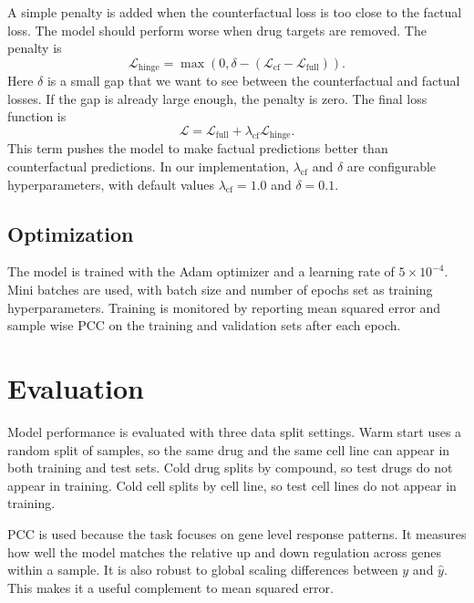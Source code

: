 A simple penalty is added when the counterfactual loss is too close to the factual loss. The model should perform worse when drug targets are removed. The penalty is
\begin{equation}
\mathcal{L}_{\mathrm{hinge}}=\max\!\left(0,\delta-\left(\mathcal{L}_{\mathrm{cf}}-\mathcal{L}_{\mathrm{full}}\right)\right).
\end{equation}
Here $\delta$ is a small gap that we want to see between the counterfactual and factual losses. If the gap is already large enough, the penalty is zero.
The final loss function is
\begin{equation}
\mathcal{L}=\mathcal{L}_{\mathrm{full}}+\lambda_{\mathrm{cf}}\mathcal{L}_{\mathrm{hinge}}.
\end{equation}
This term pushes the model to make factual predictions better than counterfactual predictions. In our implementation, $\lambda_{\mathrm{cf}}$ and $\delta$ are configurable hyperparameters, with default values $\lambda_{\mathrm{cf}}=1.0$ and $\delta=0.1$.

\subsection{Optimization}
The model is trained with the Adam optimizer and a learning rate of $5\times 10^{-4}$. Mini batches are used, with batch size and number of epochs set as training hyperparameters. Training is monitored by reporting mean squared error and sample wise PCC on the training and validation sets after each epoch.

\section{Evaluation}
Model performance is evaluated with three data split settings. Warm start uses a random split of samples, so the same drug and the same cell line can appear in both training and test sets. Cold drug splits by compound, so test drugs do not appear in training. Cold cell splits by cell line, so test cell lines do not appear in training.

\noindent PCC is used because the task focuses on gene level response patterns. It measures how well the model matches the relative up and down regulation across genes within a sample. It is also robust to global scaling differences between $y$ and $\hat{y}$. This makes it a useful complement to mean squared error.

